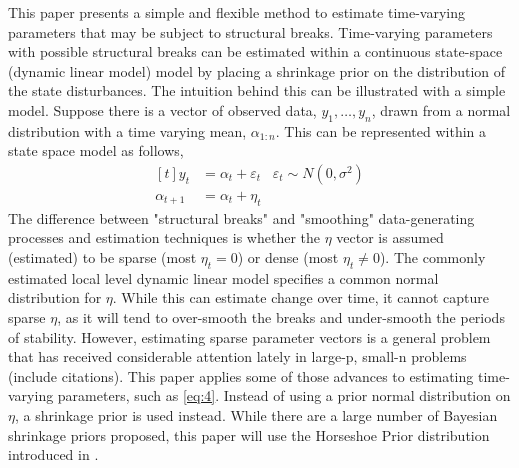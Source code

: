 \documentclass{article}
\begin{document}
This paper presents a simple and flexible method to estimate time-varying parameters that may be subject to structural breaks.
Time-varying parameters with possible structural breaks can be estimated within a continuous state-space (dynamic linear model) model by placing a shrinkage prior on the distribution of the state disturbances.
The intuition behind this can be illustrated with a simple model.
Suppose there is a vector of observed data, $y_{1}, \dots, y_{n}$, drawn from a normal distribution with a time varying mean, $\alpha_{1:n}$. 
This can be represented within a state space model as follows,
\begin{equation}
  \label{eq:4}
  \begin{aligned}[t]
    y_{t} &= \alpha_{t} + \varepsilon_{t} & \varepsilon_{t} \sim N(0, \sigma^{2}) \\
    \alpha_{t + 1} &= \alpha_{t} + \eta_{t}
  \end{aligned}
\end{equation}
The difference between "structural breaks" and "smoothing" data-generating processes and estimation techniques is whether the $\eta$ vector is assumed (estimated) to be sparse (most $\eta_{t} = 0$) or dense (most $\eta_{t} \neq 0$).
The commonly estimated local level dynamic linear model specifies a common normal distribution for $\eta$.
While this can estimate change over time, it cannot capture sparse $\eta$, as it will tend to over-smooth the breaks and under-smooth the periods of stability.
However, estimating sparse parameter vectors is a general problem that has received considerable attention lately in large-p, small-n problems (include citations).
This paper applies some of those advances to estimating time-varying parameters, such as \eqref{eq:4}.
Instead of using a prior normal distribution on $\eta$, a shrinkage prior is used instead.
While there are a large number of Bayesian shrinkage priors proposed, this paper will use the Horseshoe Prior distribution introduced in \textcites{CarvalhoPolsonScott2009}{CarvalhoPolsonScott2010}.
\end{document}
